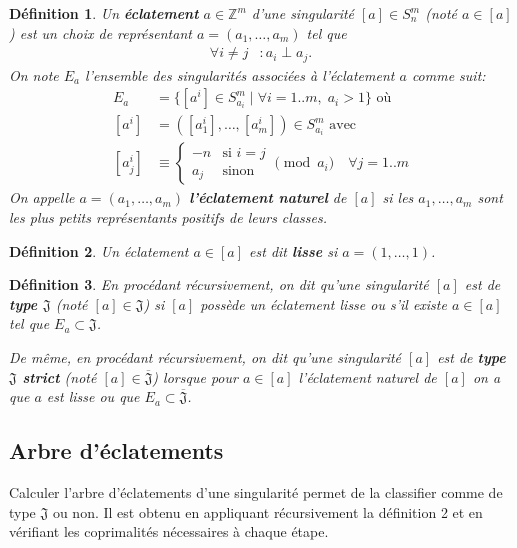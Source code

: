\documentclass{article}
\newtheorem{definition}{Définition}
\newcommand{\J}{\mathfrak{J}}
\newcommand{\JS}{\overline{\J}}
\begin{document}
\begin{definition}
    Un \textbf{éclatement} $a \in \mathbb{Z}^m$ d'une singularité $[a] \in S_n^m$ (noté $a \in [a]$) est un choix de 
    représentant $a = (a_1, \dots, a_m)$ tel que
    \begin{align*}
        \forall i \neq j & : a_i \perp a_j.
    \end{align*}
    On note $E_a$ l'ensemble des singularités associées à l'éclatement $a$ comme suit:
    \begin{align*}
        E_a & = \{ [a^i] \in S_{a_i}^m \mid \forall i = 1..m,\; a_i > 1 \} \text{ où}\\
        [a^i] & = ([a^i_1], \dots, [a^i_m]) \in S_{a_i}^m \text{ avec} \\
        [a^i_j] & \equiv \begin{cases}
            -n & \text{si $i = j$} \\
            a_j & \text{sinon}
        \end{cases} \pmod{a_i} \quad \forall j = 1..m
    \end{align*}
    On appelle $a = (a_1, \dots, a_m)$ \textbf{l'éclatement naturel} de $[a]$ si 
    les $a_1, \dots, a_m$ sont les plus petits représentants positifs de leurs classes.
\end{definition}

\begin{definition}
    Un éclatement $a \in [a]$ est dit \textbf{lisse} si $a = (1, \dots, 1)$.
\end{definition}

\begin{definition}
    En procédant récursivement, on dit qu'une singularité $[a]$ est de \textbf{type $\J$} (noté $[a] \in \J$)
    si $[a]$ possède un éclatement lisse ou s'il existe $a \in [a]$ tel que $E_a \subset \J$.

    De même, en procédant récursivement, on dit qu'une singularité $[a]$ est de \textbf{type $\J$ strict} (noté $[a] \in \JS$) lorsque 
    pour $a \in [a]$ l'éclatement naturel de $[a]$ on a que $a$ est lisse ou que $E_a \subset \JS$.
\end{definition}

\newpage

\subsection{Arbre d'éclatements}

Calculer l'arbre d'éclatements d'une singularité permet de la classifier 
comme de type $\J$ ou non. Il est obtenu en appliquant récursivement la définition 2
et en vérifiant les coprimalités nécessaires à chaque étape.
\end{document}
